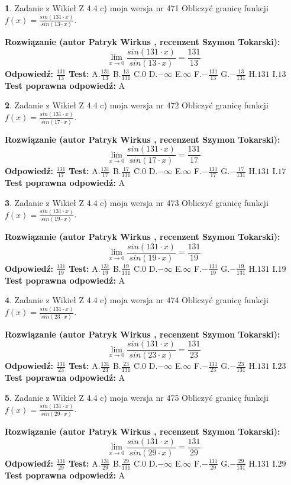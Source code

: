 \documentclass[12pt, a4paper]{article}
\theoremstyle{definition} %
\newtheorem{zad}{}
\newcommand{\zadStart}[1]{\begin{zad}#1\newline}
\newcommand{\zadStop}{\end{zad}}
\newcommand{\rozwStart}[2]{\noindent \textbf{Rozwiązanie (autor #1 , recenzent #2): }\newline}
\newcommand{\rozwStop}{\newline}
\newcommand{\odpStart}{\noindent \textbf{Odpowiedź:}\newline}
\newcommand{\odpStop}{\newline}
\newcommand{\testStart}{\noindent \textbf{Test:}\newline}
\newcommand{\testStop}{\newline}
\newcommand{\kluczStart}{\noindent \textbf{Test poprawna odpowiedź:}\newline}
\newcommand{\kluczStop}{\newline}
\begin{document}
\zadStart{Zadanie z Wikieł Z 4.4 c) moja wersja nr 471}
Obliczyć granicę funkcji $f(x)=\frac{sin(131\cdot x)}{sin(13\cdot x)}$.
\zadStop
\rozwStart{Patryk Wirkus}{Szymon Tokarski}
$$\lim\limits_{x\to 0}\frac{sin(131\cdot x)}{sin(13\cdot x)}=
\frac{131}{13}$$
\rozwStop
\odpStart
$\frac{131}{13}$
\odpStop
\testStart
A.$\frac{131}{13}$
B.$\frac{13}{131}$
C.$0$
D.$-\infty$
E.$\infty$
F.$-\frac{131}{13}$
G.$-\frac{13}{131}$
H.$131$
I.$13$
\testStop
\kluczStart
A
\kluczStop



\zadStart{Zadanie z Wikieł Z 4.4 c) moja wersja nr 472}
Obliczyć granicę funkcji $f(x)=\frac{sin(131\cdot x)}{sin(17\cdot x)}$.
\zadStop
\rozwStart{Patryk Wirkus}{Szymon Tokarski}
$$\lim\limits_{x\to 0}\frac{sin(131\cdot x)}{sin(17\cdot x)}=
\frac{131}{17}$$
\rozwStop
\odpStart
$\frac{131}{17}$
\odpStop
\testStart
A.$\frac{131}{17}$
B.$\frac{17}{131}$
C.$0$
D.$-\infty$
E.$\infty$
F.$-\frac{131}{17}$
G.$-\frac{17}{131}$
H.$131$
I.$17$
\testStop
\kluczStart
A
\kluczStop



\zadStart{Zadanie z Wikieł Z 4.4 c) moja wersja nr 473}
Obliczyć granicę funkcji $f(x)=\frac{sin(131\cdot x)}{sin(19\cdot x)}$.
\zadStop
\rozwStart{Patryk Wirkus}{Szymon Tokarski}
$$\lim\limits_{x\to 0}\frac{sin(131\cdot x)}{sin(19\cdot x)}=
\frac{131}{19}$$
\rozwStop
\odpStart
$\frac{131}{19}$
\odpStop
\testStart
A.$\frac{131}{19}$
B.$\frac{19}{131}$
C.$0$
D.$-\infty$
E.$\infty$
F.$-\frac{131}{19}$
G.$-\frac{19}{131}$
H.$131$
I.$19$
\testStop
\kluczStart
A
\kluczStop



\zadStart{Zadanie z Wikieł Z 4.4 c) moja wersja nr 474}
Obliczyć granicę funkcji $f(x)=\frac{sin(131\cdot x)}{sin(23\cdot x)}$.
\zadStop
\rozwStart{Patryk Wirkus}{Szymon Tokarski}
$$\lim\limits_{x\to 0}\frac{sin(131\cdot x)}{sin(23\cdot x)}=
\frac{131}{23}$$
\rozwStop
\odpStart
$\frac{131}{23}$
\odpStop
\testStart
A.$\frac{131}{23}$
B.$\frac{23}{131}$
C.$0$
D.$-\infty$
E.$\infty$
F.$-\frac{131}{23}$
G.$-\frac{23}{131}$
H.$131$
I.$23$
\testStop
\kluczStart
A
\kluczStop



\zadStart{Zadanie z Wikieł Z 4.4 c) moja wersja nr 475}
Obliczyć granicę funkcji $f(x)=\frac{sin(131\cdot x)}{sin(29\cdot x)}$.
\zadStop
\rozwStart{Patryk Wirkus}{Szymon Tokarski}
$$\lim\limits_{x\to 0}\frac{sin(131\cdot x)}{sin(29\cdot x)}=
\frac{131}{29}$$
\rozwStop
\odpStart
$\frac{131}{29}$
\odpStop
\testStart
A.$\frac{131}{29}$
B.$\frac{29}{131}$
C.$0$
D.$-\infty$
E.$\infty$
F.$-\frac{131}{29}$
G.$-\frac{29}{131}$
H.$131$
I.$29$
\testStop
\kluczStart
A
\kluczStop
\end{document}
